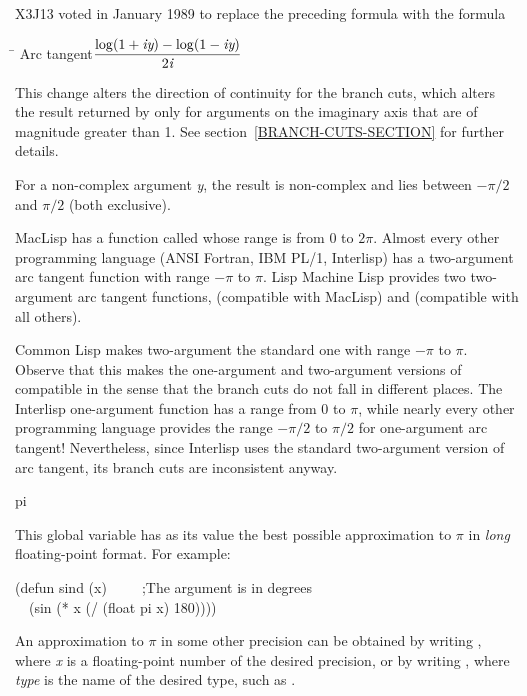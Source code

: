 \begin{defun}[Function]
\begin{new}
X3J13 voted in January 1989
to replace the preceding formula with the formula
\begin{tabbing}
\hskip 10pc\=\kill
Arc tangent\>$ \displaystyle { \log (1+\emph{i}\emph{y}) - \log (1-\emph{i}\emph{y}) \over 2\emph{i} } $
\end{tabbing}
This change alters the direction of continuity for the
branch cuts, which alters the result returned by 
only for arguments on the imaginary axis that
are of magnitude greater than 1.
See section~\ref{BRANCH-CUTS-SECTION} for further details.
\end{new}

For a non-complex argument \emph{y}, the result is non-complex and lies between
$-\pi/2$ and $\pi/2$ (both exclusive).

\beforenoterule
\begin{incompatibility}
MacLisp has a function called  whose
range is from 0 to $2\pi$.  Almost every other programming language
(ANSI Fortran, IBM PL/1, Interlisp) has a two-argument arc tangent
function with range $-\pi$ to $\pi$.
Lisp Machine Lisp provides two two-argument
arc tangent functions,  (compatible with MacLisp)
and  (compatible with all others).

Common Lisp makes two-argument  the standard one
with range $-\pi$ to $\pi$.  Observe that this makes
the one-argument and two-argument versions of  compatible
in the sense that the branch cuts do not fall in different places.
The Interlisp one-argument function  has a range
from 0 to $\pi$, while nearly every other programming language
provides the range $-\pi/2$ to $\pi/2$ for
one-argument arc tangent!
Nevertheless, since Interlisp uses the standard two-argument
version of arc tangent, its branch cuts are inconsistent anyway.
\end{incompatibility}
\afternoterule
\end{defun}

\begin{defun}[Constant]
pi

This global variable has as its value the best possible approximation to
$\pi$ in \emph{long} floating-point format.
For example:
\begin{lisp}
(defun sind (x)~~~~~;\textrm{The argument is in degrees} \\
~~(sin (* x (/ (float pi x) 180))))
\end{lisp}
An approximation to $\pi$ in some other precision can
be obtained by writing , where \emph{x} is a
floating-point number of the desired precision,
or by writing , where \emph{type} is the
name of the desired type, such as .
\end{defun}

